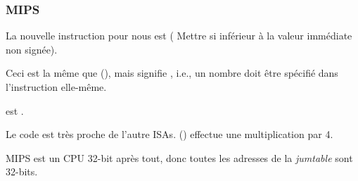 \subsubsection{MIPS}




La nouvelle instruction pour nous est  (
Mettre si inférieur à la valeur immédiate non signée).

Ceci est la même que  (), mais  signifie
, i.e., un nombre doit être spécifié dans l'instruction elle-même.

 est .

Le code est très proche de l'autre \ac{ISA}s.
 () effectue une multiplication par 4.

MIPS est un CPU 32-bit après tout, donc toutes les adresses de la \emph{jumtable}
sont 32-bits.

